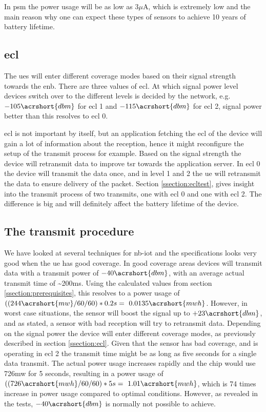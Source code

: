 \documentclass[USenglish]{ifimaster}  %
\begin{document}
In \acrshort{psm} the power usage will be as low as 3$\mu$A, which is extremely low and the main reason why one can expect these types of sensors to achieve 10 years of battery lifetime.

\subsection{\acrlong{ecl}} \label{ssection:ecl}
The \acrshort{ue}s will enter different coverage modes based on their signal strength towards the \acrshort{enb}. There are three values of \acrfull{ecl}. At which signal power level devices switch over to the different levels is decided by the network, e.g. ${-105 \acrshort{dbm}}$ for \acrshort{ecl} 1 and ${-115 \acrshort{dbm}}$ for \acrshort{ecl} 2, signal power better than this resolves to \acrshort{ecl} 0.

\acrshort{ecl} is not important by itself, but an application fetching the \acrshort{ecl} of the device will gain a lot of information about the reception, hence it might reconfigure the setup of the transmit process for example. Based on the signal strength the device will retransmit data to improve \acrfull{tsr} towards the application server. In \acrshort{ecl} 0 the device will transmit the data once, and in level 1 and 2 the \acrshort{ue} will retransmit the data to ensure delivery of the packet. Section \vref{ssection:ecltest}, gives insight into the transmit process of two transmits, one with \acrshort{ecl} 0 and one with \acrshort{ecl} 2. The difference is big and will definitely affect the battery lifetime of the device.

\subsection{The transmit procedure} \label{ssection:transmitprocedure}
We have looked at several techniques for \acrshort{nb-iot} and the specifications looks very good when the \acrshort{ue} has good coverage. In good coverage areas devices will transmit data with a transmit power of ${-40 \acrshort{dbm}}$, with an average actual transmit time of \textasciitilde200ms. Using the calculated values from section \vref{ssection:prerequisites}, this resolves to a power usage of ${((244 \acrshort{mw} / 60 / 60) * 0.2s = ~0.0135 \acrshort{mwh}}$. However, in worst case situations, the sensor will boost the signal up to ${+23 \acrshort{dbm}}$, and as stated, a sensor with bad reception will try to retransmit data. Depending on the signal power the device will enter different coverage modes, as previously described in section \vref{ssection:ecl}. Given that the sensor has bad coverage, and is operating in \acrshort{ecl} 2 the transmit time might be as long as five seconds for a single data transmit.
The actual power usage increases rapidly and the chip would use 726\acrshort{mw} for 5 seconds, resulting in a power usage of ${((726 \acrshort{mwh} / 60 / 60) * 5s = ~1.01 \acrshort{mwh}}$, which is 74 times increase in power usage compared to optimal conditions. However, as revealed in the tests, ${-40 \acrshort{dbm}}$ is normally not possible to achieve.
\end{document}
